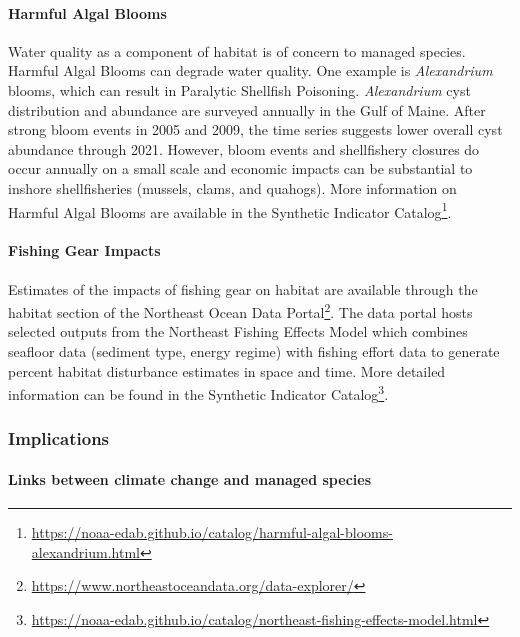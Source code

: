 \documentclass[
  10pt,
]{article}
\begin{document}
\hypertarget{harmful-algal-blooms}{%
\paragraph{Harmful Algal Blooms}\label{harmful-algal-blooms}}

Water quality as a component of habitat is of concern to managed species. Harmful Algal Blooms can degrade water quality. One example is \emph{Alexandrium} blooms, which can result in Paralytic Shellfish Poisoning. \emph{Alexandrium} cyst distribution and abundance are surveyed annually in the Gulf of Maine. After strong bloom events in 2005 and 2009, the time series suggests lower overall cyst abundance through 2021. However, bloom events and shellfishery closures do occur annually on a small scale and economic impacts can be substantial to inshore shellfisheries (mussels, clams, and quahogs). More information on Harmful Algal Blooms are available in the Synthetic Indicator Catalog\footnote{\url{https://noaa-edab.github.io/catalog/harmful-algal-blooms-alexandrium.html}}.

\hypertarget{fishing-gear-impacts}{%
\paragraph{Fishing Gear Impacts}\label{fishing-gear-impacts}}

Estimates of the impacts of fishing gear on habitat are available through the habitat section of the Northeast Ocean Data Portal\footnote{\url{https://www.northeastoceandata.org/data-explorer/}}. The data portal hosts selected outputs from the Northeast Fishing Effects Model which combines seafloor data (sediment type, energy regime) with fishing effort data to generate percent habitat disturbance estimates in space and time. More detailed information can be found in the Synthetic Indicator Catalog\footnote{\url{https://noaa-edab.github.io/catalog/northeast-fishing-effects-model.html}}.

\hypertarget{implications-6}{%
\subsubsection{Implications}\label{implications-6}}

\hypertarget{links-between-climate-change-and-managed-species}{%
\paragraph{Links between climate change and managed species}\label{links-between-climate-change-and-managed-species}}
\end{document}
